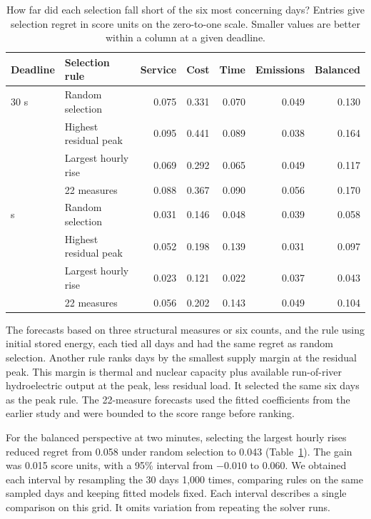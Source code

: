 \documentclass[11pt,a4paper]{article}
\newcommand{\tablefont}{\small\renewcommand{\arraystretch}{1.14}}
\begin{document}
\begin{table}[htbp]\centering\tablefont
\caption{How far did each selection fall short of the six most concerning days? Entries give selection regret in score units on the zero-to-one scale. Smaller values are better within a column at a given deadline.}
\label{tab:fixed_regret}
\begin{tabular}{@{}llrrrrr@{}}\toprule
Deadline & Selection rule & Service & Cost & Time & Emissions & Balanced\\\midrule
30 s & Random selection & 0.075 & 0.331 & 0.070 & 0.049 & 0.130\\
 & Highest residual peak & 0.095 & 0.441 & 0.089 & 0.038 & 0.164\\
 & Largest hourly rise & 0.069 & 0.292 & 0.065 & 0.049 & 0.117\\
 & 22 measures & 0.088 & 0.367 & 0.090 & 0.056 & 0.170\\
\addlinespace
120 s & Random selection & 0.031 & 0.146 & 0.048 & 0.039 & 0.058\\
 & Highest residual peak & 0.052 & 0.198 & 0.139 & 0.031 & 0.097\\
 & Largest hourly rise & 0.023 & 0.121 & 0.022 & 0.037 & 0.043\\
 & 22 measures & 0.056 & 0.202 & 0.143 & 0.049 & 0.104\\
\bottomrule\end{tabular}
\end{table}

The forecasts based on three structural measures or six counts, and the rule using initial stored energy, each tied all days and had the same regret as random selection. Another rule ranks days by the smallest supply margin at the residual peak. This margin is thermal and nuclear capacity plus available run-of-river hydroelectric output at the peak, less residual load. It selected the same six days as the peak rule. The 22-measure forecasts used the fitted coefficients from the earlier study and were bounded to the score range before ranking.

For the balanced perspective at two minutes, selecting the largest hourly rises reduced regret from 0.058 under random selection to 0.043 (Table~\ref{tab:fixed_regret}). The gain was 0.015 score units, with a 95\% interval from \(-0.010\) to \(0.060\). We obtained each interval by resampling the 30 days 1,000 times, comparing rules on the same sampled days and keeping fitted models fixed. Each interval describes a single comparison on this grid. It omits variation from repeating the solver runs.
\end{document}
